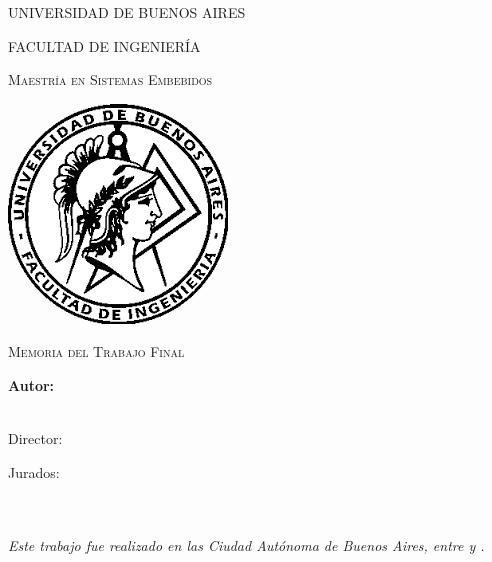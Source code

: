 \documentclass[
11pt, %
spanish,
singlespacing, %
parskip, %
headsepline, %
]{MastersDoctoralThesis} %
\author{Esp. Ing. Eric Nicolás Pernia} %
\begin{document}
\frontmatter 

\pagestyle{plain}


\begin{titlepage}
\begin{center}

{\scshape\LARGE UNIVERSIDAD DE BUENOS AIRES\par}\vspace{0.1cm} %
{\scshape\LARGE FACULTAD DE INGENIERÍA\par}\vspace{0.1cm} %
{\scshape\LARGE Maestría en Sistemas Embebidos\par}\vspace{1cm} %

\includegraphics[width=.3\textwidth]{./Figures/logoFIUBA.png}
\vspace{0.7cm}

\textsc{\Large Memoria del Trabajo Final}\\[0.5cm] %

{\huge \bfseries \ttitle\par}\vspace{0.4cm} %

\vspace{0.7cm}
\LARGE\textbf{Autor:\\
\authorname}\\ %

\vspace{1cm}

\large
\vspace{10px}
{Director:} \\
{\supname} %
 
\vspace{0.7cm}
Jurados:\\
\jurunoname\\
\jurdosname\\
\jurtresname
 
\vfill
\textit{Este trabajo fue realizado en las Ciudad Autónoma de Buenos Aires, entre \fechaINICIOname \hspace{1px} y \fechaFINALname.}
\end{center}
\end{titlepage}
\end{document}
